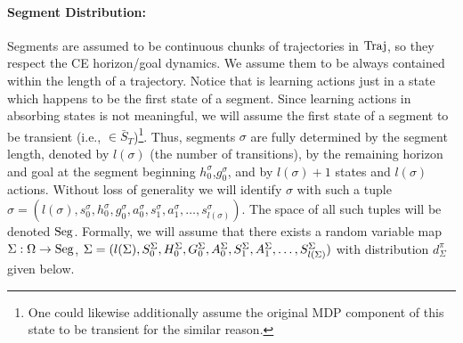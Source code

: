 \paragraph{Segment Distribution:}
Segments are assumed to be continuous chunks of trajectories in $\mathrm{Traj}$,
so they respect the CE horizon/goal dynamics.
We assume them to be always contained within the length of a trajectory.
Notice that \eUDRL{} is learning actions just in a state which happens to be the first state of a segment.
Since learning actions in absorbing states is not meaningful, we will assume the first state of a segment to be transient (i.e., $\in \bar{S}_T$)\footnote{One could likewise additionally assume the original MDP component of this state to be transient for the similar reason.}.
Thus, segments $\sigma$ are fully determined by the
segment length, denoted by $l(\sigma)$ (the number of transitions), by the
remaining horizon and goal at the segment beginning
$h_0^{\sigma}$,$g_0^{\sigma}$, and by $l(\sigma)+1$ states and $l(\sigma)$
actions. Without loss of generality we will identify $\sigma$ with such a tuple
$\sigma=(l(\sigma),s_0^{\sigma},h_0^{\sigma},g_0^{\sigma},a_0^{\sigma},s_1^{\sigma},a_1^{\sigma},\ldots,s_{l(\sigma)}^{\sigma})$.
The space of all such tuples will be denoted $\mathrm{Seg}$.
Formally, we will assume that there exists a random variable map $\Sigma: \Omega \rightarrow \mathrm{Seg}$, $\Sigma = (l(\Sigma),S^{\Sigma}_0,H^{\Sigma}_0,G^{\Sigma}_0,A^{\Sigma}_0,S^{\Sigma}_1,A^{\Sigma}_1,\ldots,S^{\Sigma}_{l(\Sigma)})$
with distribution $d_{\Sigma}^{\pi}$ given
below.

